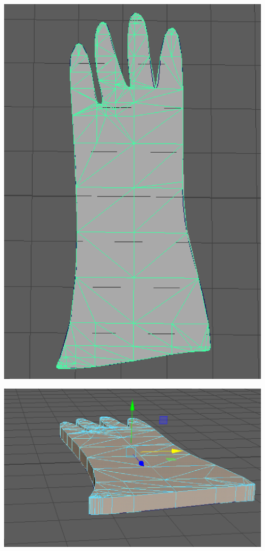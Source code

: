 \documentclass[a4paper, openright, twoside]{book}
\begin{document}
\begin{minipage}{\textwidth}
\begin{center}
\begin{minipage}{0.18\textwidth}
        \includegraphics[width=1\textwidth]{images/topoly.png}
    \end{minipage}\hfill
        \centering
    \begin{minipage}{0.18\textwidth}
        \centering
        \includegraphics[width=1\textwidth]{images/extrude.png}

\end{minipage}
\end{center}
\end{minipage}
\end{document}
